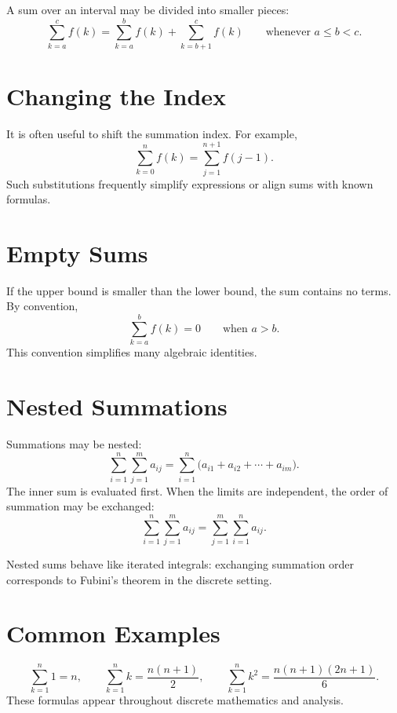 A sum over an interval may be divided into smaller pieces:
\[
\sum_{k=a}^{c} f(k)
=
\sum_{k=a}^{b} f(k)
+
\sum_{k=b+1}^{c} f(k)
\qquad \text{whenever } a \le b < c.
\]

\section*{Changing the Index}

It is often useful to shift the summation index. For example,
\[
\sum_{k=0}^{n} f(k) = \sum_{j=1}^{n+1} f(j-1).
\]
Such substitutions frequently simplify expressions or align sums
with known formulas.

\section*{Empty Sums}

If the upper bound is smaller than the lower bound, the sum contains
no terms. By convention,
\[
\sum_{k=a}^{b} f(k) = 0 \qquad \text{when } a > b.
\]
This convention simplifies many algebraic identities.

\section*{Nested Summations}

Summations may be nested:
\[
\sum_{i=1}^{n} \sum_{j=1}^{m} a_{ij}
= \sum_{i=1}^{n}\bigl(a_{i1} + a_{i2} + \cdots + a_{im}\bigr).
\]
The inner sum is evaluated first. When the limits are independent,
the order of summation may be exchanged:
\[
\sum_{i=1}^{n}\sum_{j=1}^{m} a_{ij}
=
\sum_{j=1}^{m}\sum_{i=1}^{n} a_{ij}.
\]

\begin{remark*}
Nested sums behave like iterated integrals: exchanging summation order
corresponds to Fubini's theorem in the discrete setting.
\end{remark*}

\section*{Common Examples}

\[
\sum_{k=1}^{n} 1 = n, \qquad
\sum_{k=1}^{n} k = \frac{n(n+1)}{2}, \qquad
\sum_{k=1}^{n} k^2 = \frac{n(n+1)(2n+1)}{6}.
\]
These formulas appear throughout discrete mathematics and analysis.
